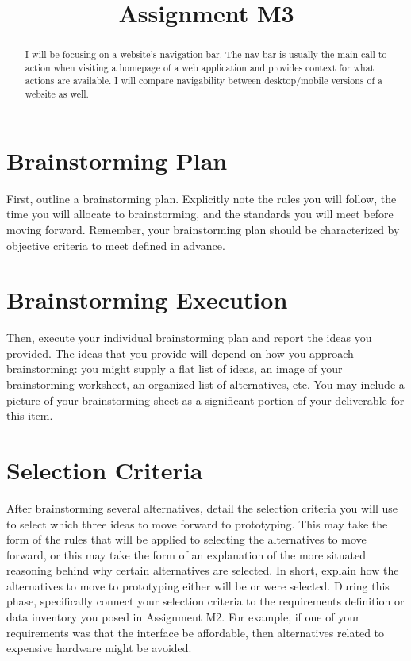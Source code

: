

\title{Assignment M3\\}



\maketitle
\thispagestyle{fancy}

\begin{abstract}
I will be focusing on a website’s navigation bar. The nav bar is usually the main call to action when visiting a homepage of a web application and provides context for what actions are available. I will compare navigability between desktop/mobile versions of a website as well.
\end{abstract}


\section{Brainstorming Plan}
First, outline a brainstorming plan. Explicitly note the rules you will follow, the time you will allocate to brainstorming, and the standards you will meet before moving forward. Remember, your brainstorming plan should be characterized by objective criteria to meet defined in advance.


\section{Brainstorming Execution}
Then, execute your individual brainstorming plan and report the ideas you provided. The ideas that you provide will depend on how you approach brainstorming: you might supply a flat list of ideas, an image of your brainstorming worksheet, an organized list of alternatives, etc. You may include a picture of your brainstorming sheet as a significant portion of your deliverable for this item.


\section{Selection Criteria}
After brainstorming several alternatives, detail the selection criteria you will use to select which three ideas to move forward to prototyping. This may take the form of the rules that will be applied to selecting the alternatives to move forward, or this may take the form of an explanation of the more situated reasoning behind why certain alternatives are selected. In short, explain how the alternatives to move to prototyping either will be or were selected.
During this phase, specifically connect your selection criteria to the requirements definition or data inventory you posed in Assignment M2. For example, if one of your requirements was that the interface be affordable, then alternatives related to expensive hardware might be avoided.


